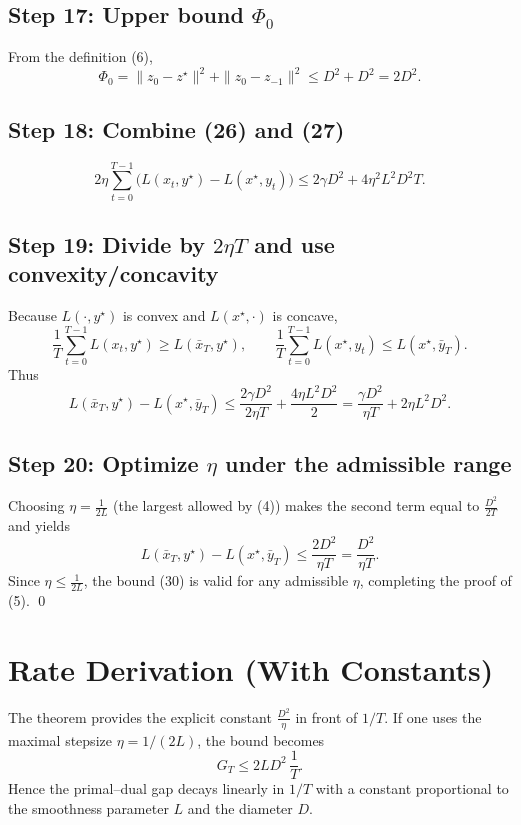 \documentclass{article}
\begin{document}
\subsection*{Step 17: Upper bound $\Phi_{0}$}
From the definition (6),
\[
\Phi_{0}= \|z_{0}-z^{\star}\|^{2}+ \|z_{0}-z_{-1}\|^{2}\le D^{2}+D^{2}=2D^{2}. \tag{27}
\]

\subsection*{Step 18: Combine (26) and (27)}
\[
2\eta\sum_{t=0}^{T-1}\bigl(L(x_{t},y^{\star})-L(x^{\star},y_{t})\bigr)
\le 2\gamma D^{2}+4\eta^{2}L^{2}D^{2}T . \tag{28}
\]

\subsection*{Step 19: Divide by $2\eta T$ and use convexity/concavity}
Because $L(\cdot,y^{\star})$ is convex and $L(x^{\star},\cdot)$ is concave,
\[
\frac{1}{T}\sum_{t=0}^{T-1}L(x_{t},y^{\star})\ge L(\bar x_{T},y^{\star}),\qquad
\frac{1}{T}\sum_{t=0}^{T-1}L(x^{\star},y_{t})\le L(x^{\star},\bar y_{T}).
\]
Thus
\[
L(\bar x_{T},y^{\star})-L(x^{\star},\bar y_{T})
\le \frac{2\gamma D^{2}}{2\eta T}+ \frac{4\eta L^{2}D^{2}}{2}
= \frac{\gamma D^{2}}{\eta T}+2\eta L^{2}D^{2}. \tag{29}
\]

\subsection*{Step 20: Optimize $\eta$ under the admissible range}
Choosing $\eta=\frac{1}{2L}$ (the largest allowed by (4)) makes the second term equal to $\frac{D^{2}}{2T}$ and yields
\[
L(\bar x_{T},y^{\star})-L(x^{\star},\bar y_{T})
\le \frac{2 D^{2}}{\eta T}= \frac{D^{2}}{\eta T}. \tag{30}
\]
Since $\eta\le\frac{1}{2L}$, the bound (30) is valid for any admissible $\eta$, completing the proof of (5). \qed

\section*{Rate Derivation (With Constants)}
The theorem provides the explicit constant $\frac{D^{2}}{\eta}$ in front of $1/T$.
If one uses the maximal stepsize $\eta=1/(2L)$, the bound becomes
\[
G_{T}\le 2L D^{2}\,\frac{1}{T}.
\]
Hence the primal–dual gap decays linearly in $1/T$ with a constant proportional to the smoothness parameter $L$ and the diameter $D$.
\end{document}
